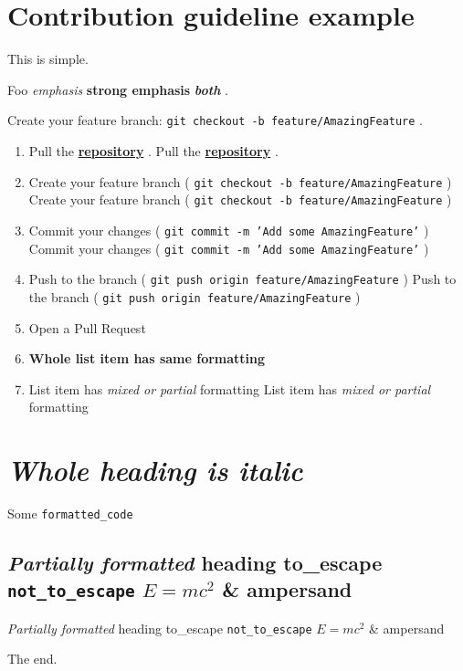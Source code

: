 \section*{Contribution guideline example}

This is simple.

Foo \textit{emphasis} \textbf{strong emphasis} \textit{\textbf{both}} .

Create your feature branch: \texttt{git checkout -b feature/AmazingFeature} .

\begin{enumerate}
\item Pull the \href{https://github.com/docling-project/docling}{\textbf{repository}} .
Pull the \href{https://github.com/docling-project/docling}{\textbf{repository}} .
\item Create your feature branch ( \texttt{git checkout -b feature/AmazingFeature} )
Create your feature branch ( \texttt{git checkout -b feature/AmazingFeature} )
\item Commit your changes ( \texttt{git commit -m 'Add some AmazingFeature'} )
Commit your changes ( \texttt{git commit -m 'Add some AmazingFeature'} )
\item Push to the branch ( \texttt{git push origin feature/AmazingFeature} )
Push to the branch ( \texttt{git push origin feature/AmazingFeature} )
\item Open a Pull Request
\item \textbf{Whole list item has same formatting}
\item List item has \textit{mixed or partial} formatting
List item has \textit{mixed or partial} formatting
\end{enumerate}

\section*{\textit{Whole heading is italic}}

Some \texttt{formatted_code}

\subsection{\textit{Partially formatted} heading to\_escape \texttt{not_to_escape} $E=mc^2$ \& ampersand}

\textit{Partially formatted} heading to\_escape \texttt{not_to_escape} $E=mc^2$ \& ampersand

The end.
